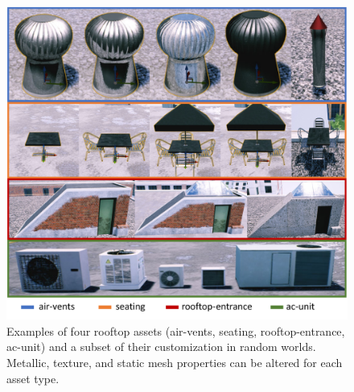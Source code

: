 \begin{figure}[ht!]
\centering
\includegraphics[width=.60\linewidth]{chapter_6_landingsim/figs/assets_all.pdf}
\caption[Examples of rooftop asset modelling and customization]{Examples of four rooftop assets (air-vents, seating, rooftop-entrance, ac-unit) and a subset of their customization in random worlds. Metallic, texture, and static mesh properties can be altered for each asset type.  }
\label{fig:ch6_all_assets}
\end{figure}


